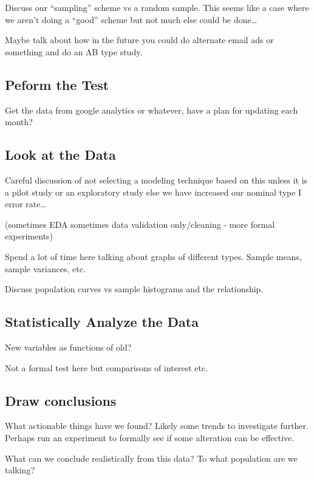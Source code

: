 \documentclass[]{book}
\theoremstyle{definition}
\theoremstyle{definition}
\theoremstyle{definition}
\theoremstyle{remark}
\begin{document}
Discuss our ``sampling'' scheme vs a random sample. This seems like a
case where we aren't doing a ``good'' scheme but not much else could be
done\ldots{}

Maybe talk about how in the future you could do alternate email ads or
something and do an AB type study.

\subsection{Peform the Test }\label{peform-the-test}

Get the data from google analytics or whatever, have a plan for updating
each month?

\subsection{Look at the Data }\label{look-at-the-data}

Careful discussion of not selecting a modeling technique based on this
unless it is a pilot study or an exploratory study else we have
increased our nominal type I error rate\ldots{}

(sometimes EDA sometimes data validation only/cleaning - more formal
experiments)

Spend a lot of time here talking about graphs of different types. Sample
means, sample variances, etc.

Discuss population curves vs sample histograms and the relationship.

\subsection{Statistically Analyze the
Data}\label{statistically-analyze-the-data}

New variables as functions of old?

Not a formal test here but comparisons of interest etc.

\subsection{Draw conclusions}\label{draw-conclusions}

What actionable things have we found? Likely some trends to investigate
further. Perhaps run an experiment to formally see if some alteration
can be effective.

What can we conclude realistically from this data? To what population
are we talking?
\end{document}
